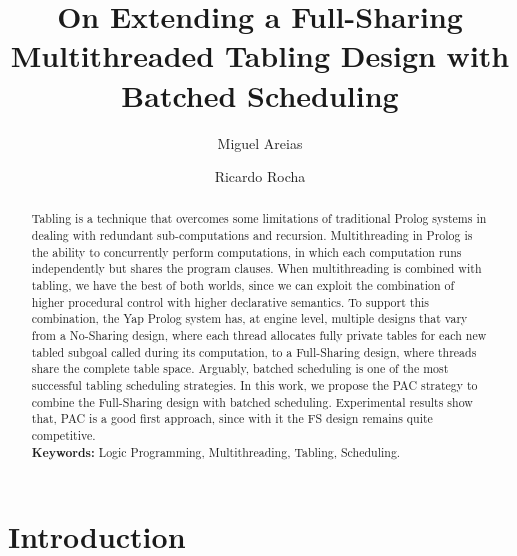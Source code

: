\documentclass{llncs}
\begin{document}
\title{On Extending a Full-Sharing Multithreaded Tabling Design with
  Batched Scheduling}

\author{Miguel Areias \and Ricardo Rocha}


\maketitle


\begin{abstract}
Tabling is a technique that overcomes some limitations of traditional
Prolog systems in dealing with redundant sub-computations and
recursion. Multithreading in Prolog is the ability to concurrently
perform computations, in which each computation runs independently but
shares the program clauses. When multithreading is combined with
tabling, we have the best of both worlds, since we can exploit the
combination of higher procedural control with higher declarative
semantics. To support this combination, the Yap Prolog system has, at
engine level, multiple designs that vary from a No-Sharing design,
where each thread allocates fully private tables for each new tabled
subgoal called during its computation, to a Full-Sharing design, where
threads share the complete table space. Arguably, batched scheduling
is one of the most successful tabling scheduling strategies. In this
work, we propose the PAC strategy to combine the Full-Sharing design
with batched scheduling. Experimental results show that, PAC is a good
first approach, since with it the FS design remains quite
competitive.\\

\textbf{Keywords:} Logic Programming, Multithreading, Tabling, Scheduling.
\end{abstract}


\section{Introduction}
\end{document}
